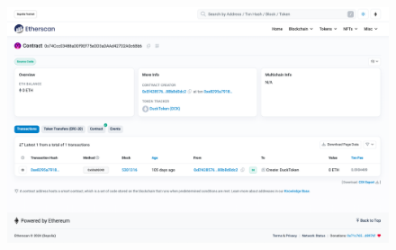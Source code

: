     \begin{figure}[ht!]
        \centering
        \includegraphics[scale=0.32]{IMAGES/etherscan-token.png}
        \label{fig_vsc}
    \end{figure}


